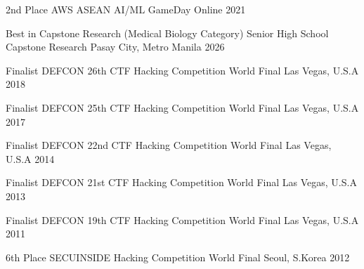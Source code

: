 



\begin{cvhonors}

  \cvhonor
    {2nd Place} %
    {AWS ASEAN AI/ML GameDay} %
    {Online} %
    {2021} %

  \cvhonor
    {Best in Capstone Research (Medical Biology Category)}
    {Senior High School Capstone Research}
    {Pasay City, Metro Manila}
    {2026}

  \cvhonor
    {Finalist} %
    {DEFCON 26th CTF Hacking Competition World Final} %
    {Las Vegas, U.S.A} %
    {2018} %

  \cvhonor
    {Finalist} %
    {DEFCON 25th CTF Hacking Competition World Final} %
    {Las Vegas, U.S.A} %
    {2017} %

  \cvhonor
    {Finalist} %
    {DEFCON 22nd CTF Hacking Competition World Final} %
    {Las Vegas, U.S.A} %
    {2014} %

  \cvhonor
    {Finalist} %
    {DEFCON 21st CTF Hacking Competition World Final} %
    {Las Vegas, U.S.A} %
    {2013} %

  \cvhonor
    {Finalist} %
    {DEFCON 19th CTF Hacking Competition World Final} %
    {Las Vegas, U.S.A} %
    {2011} %

  \cvhonor
    {6th Place} %
    {SECUINSIDE Hacking Competition World Final} %
    {Seoul, S.Korea} %
    {2012} %

\end{cvhonors}


